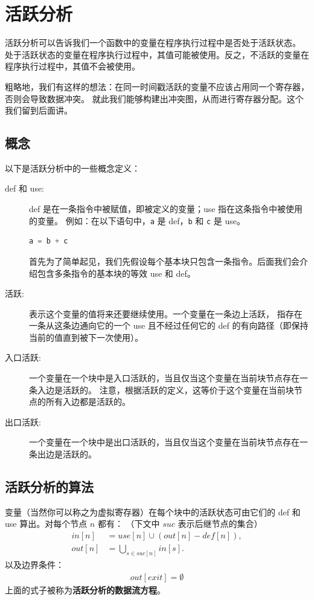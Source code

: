 \section{活跃分析}

活跃分析可以告诉我们一个函数中的变量在程序执行过程中是否处于活跃状态。
处于活跃状态的变量在程序执行过程中，其值可能被使用。反之，不活跃的变量在程序执行过程中，其值不会被使用。

粗略地，我们有这样的想法：在同一时间戳活跃的变量不应该占用同一个寄存器，否则会导致数据冲突。
就此我们能够构建出冲突图，从而进行寄存器分配。这个我们留到后面讲。

\subsection{概念}

以下是活跃分析中的一些概念定义：

\begin{description}
    \item[def 和 use:]def 是在一条指令中被赋值，即被定义的变量；use 指在这条指令中被使用的变量。
例如：在以下语句中，\texttt{a} 是 def，\texttt{b} 和 \texttt{c} 是 use。
\begin{lstlisting}[language=c]
    a = b + c
\end{lstlisting}

首先为了简单起见，我们先假设每个基本块只包含一条指令。后面我们会介绍包含多条指令的基本块的等效 use 和 def。

\item[活跃:] 表示这个变量的值将来还要继续使用。一个变量在一条边上活跃，
  指存在一条从这条边通向它的一个 use 且不经过任何它的 def 的有向路径（即保持当前的值直到被下一次使用）。

\item[入口活跃:] 一个变量在一个块中是入口活跃的，当且仅当这个变量在当前块节点存在一条入边是活跃的。
  注意，根据活跃的定义，这等价于这个变量在当前块节点的所有入边都是活跃的。

\item[出口活跃:] 一个变量在一个块中是出口活跃的，当且仅当这个变量在当前块节点存在一条出边是活跃的。

\end{description}

\subsection{活跃分析的算法}

变量（当然你可以称之为虚拟寄存器）在每个块中的活跃状态可由它们的 def 和 use 算出。对每个节点 $n$ 都有：
（下文中 $\mathit{suc}$ 表示后继节点的集合）
\begin{align}
\label{live-analysis-data-flow-1}\mathit{in}[n]  &= \mathit{use}[n] \cup (\mathit{out}[n] - \mathit{def}[n]), \\
\label{live-analysis-data-flow-2}\mathit{out}[n] &= \bigcup_{s \in \mathit{suc}[n]} \mathit{in}[s].
\end{align}
以及边界条件：
\begin{align}
\label{live-analysis-data-flow-3}\mathit{out}[\mathit{exit}] = \emptyset
\end{align}
上面的式子被称为\textbf{活跃分析的数据流方程}。

